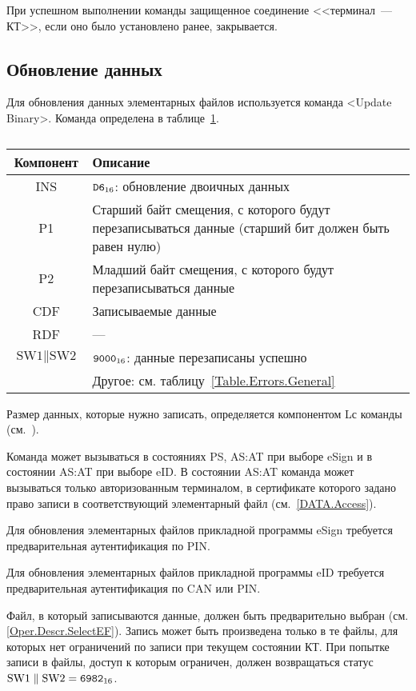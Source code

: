 При успешном выполнении команды защищенное соединение <<терминал~--- КТ>>,
если оно было установлено ранее, закрывается.

\subsection{Обновление данных}
\label{Oper.Descr.Update}

Для обновления данных элементарных файлов используется команда <Update Binary>.
Команда определена в таблице~\ref{Table.Oper.UpdateCmd}.

\begin{table}[hbt]
\caption{}\label{Table.Oper.UpdateCmd}
\begin{tabular}{|c|p{14cm}|}
\hline
Компонент & Описание\\
\hline
\hline
INS & $\texttt{D6}_{16}$: обновление двоичных данных\\
\hline
P1 & Старший байт смещения, с которого будут перезаписываться данные 
(старший бит должен быть равен нулю)\\
\hline
P2 & Младший байт смещения, с которого будут перезаписываться данные \\
\hline
CDF & Записываемые данные \\
\hline 
\hline
RDF &  --- \\
\hline
$\text{SW1} \parallel \text{SW2}$ & 
$\texttt{9000}_{16}$: данные перезаписаны успешно \\
\cline{2-2}
 & Другое: см. таблицу~\ref{Table.Errors.General} \\
\hline
\end{tabular}
\end{table}

Размер данных, которые нужно записать, определяется компонентом Lс команды 
(см.~\cite{APDU}).

Команда может вызываться в состояниях PS, AS:AT 
при выборе eSign и в состоянии AS:AT при выборе eID.
В состоянии AS:AT команда может вызываться только 
авторизованным терминалом, в сертификате которого
задано право записи в соответствующий элементарный 
файл (см.~\ref{DATA.Access}).

Для обновления элементарных файлов прикладной программы eSign 
требуется предварительная аутентификация по PIN.

Для обновления элементарных файлов прикладной программы eID 
требуется предварительная аутентификация по CAN или PIN.

Файл, в который записываются данные, должен быть предварительно
выбран (см. \ref{Oper.Descr.SelectEF}).
Запись может быть произведена только в те файлы, для которых 
нет ограничений по записи при текущем состоянии КТ. 
При попытке записи в файлы, доступ к которым ограничен, 
должен возвращаться статус $\text{SW1} \parallel\text{SW2} = \texttt{6982}_{16}$. 

